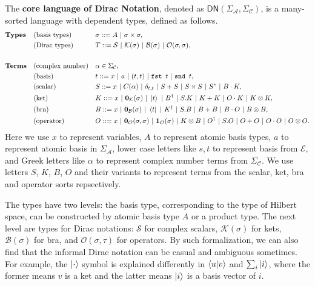 \documentclass[manuscript, review, timestamp]{acmart}
\newcommand*{\Sc}{\mathcal{S}}
\newcommand*{\K}{\mathcal{K}}
\newcommand*{\B}{\mathcal{B}}
\newcommand*{\Op}{\mathcal{O}}
\newcommand*{\fst}{\texttt{fst }}
\newcommand*{\snd}{\texttt{snd }}
\begin{document}
\begin{definition}
  The \textbf{core language of Dirac Notation}, denoted as $\textsf{DN}(\Sigma_\mathcal{A}, \Sigma_\mathcal{C})$, is a many-sorted language with dependent types, defined as follows.
  \begin{align*}
    & \textbf{Types} && \textrm{(basis types)} && \sigma ::= A\ |\ \sigma \times \sigma, \\
    & && \textrm{(Dirac types)} && T ::= \Sc\ |\ \K(\sigma)\ |\ \B(\sigma)\ |\ \Op(\sigma, \sigma), \\
    \\
    & \textbf{Terms} && \textrm{(complex number)} && \alpha \in \Sigma_\mathcal{C}, \\
    & && \textrm{(basis)} && t ::= x\ |\ a\ |\ (t, t)\ |\ \fst t\ |\ \snd t, \\
    & && \textrm{(scalar)} && S ::= x\ |\ C(\alpha)\ |\ \delta_{t, t}\ |\ S + S\ |\ S \times S\ |\ S^*\ |\ B \cdot K, \\
    & && \textrm{(ket)} && K ::= x\ |\ \mathbf{0}_\mathcal{K}(\sigma)\ |\ \ket{t}\ |\ B^\dagger\ |\ S.K\ |\ K + K\ |\ O \cdot K\ |\ K \otimes K, \\
    & && \textrm{(bra)} && B ::= x\ |\ \mathbf{0}_\mathcal{B}(\sigma)\ |\ \bra{t}\ |\ K^\dagger\ |\ S.B\ |\ B + B\ |\ B \cdot O\ |\ B \otimes B, \\
    & && \textrm{(operator)} && O ::= x\ |\ \mathbf{0}_\mathcal{O}(\sigma, \sigma)\ |\ \mathbf{1}_\mathcal{O}(\sigma)\ |\ K \otimes B\ |\ O^\dagger\ |\ S.O\ |\ O + O\ |\ O \cdot O\ |\ O \otimes O.
  \end{align*}
   Here we use $x$ to represent variables, $A$ to represent atomic basis types, $a$ to represent atomic basis in $\Sigma_\mathcal{A}$, lower case letters like $s, t$ to represent basis from $\mathcal{E}$, and Greek letters like $\alpha$ to represent complex number terms from $\Sigma_\mathcal{C}$. We use letters $S$, $K$, $B$, $O$ and their variants to represent terms from the scalar, ket, bra and operator sorts repsectively.
\end{definition}

The types have two levels: the basis type, corresponding to the type of Hilbert space, can be constructed by atomic basis type $A$ or a product type. The next level are types for Dirac notations: $\mathcal{S}$ for complex scalars, $\mathcal{K}(\sigma)$ for kets, $\mathcal{B}(\sigma)$ for bra, and $\mathcal{O}(\sigma, \tau)$ for operators. By such formalization, we can also find that the informal Dirac notation can be casual and ambiguous sometimes. For example, the $\ket{\cdot}$ symbol is explained differently in $\braket{u|v}$ and $\sum_{i}\ket{i}$, where the former means $v$ is a ket and the latter means $\ket{i}$ is a basis vector of $i$.
\end{document}
